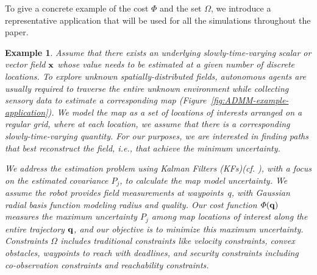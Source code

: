 \documentclass[journal]{IEEEtran}  %
\newtheorem{example}{Example}
\begin{document}
To give a concrete example of the cost $\varPhi$ and the set $\Omega$, we introduce a representative application that will be used for all the simulations throughout the paper.
\begin{example} Assume that there exists an underlying slowly-time-varying scalar or vector field $\mathbf{x}$ whose value needs to be estimated at a given number of discrete locations. To explore unknown spatially-distributed fields, autonomous agents are usually required to traverse the entire unknown environment while collecting sensory data to estimate a corresponding map (Figure~\ref{fig:ADMM-example-application}). We model the map as a set of locations of interests arranged on a regular grid, where at each location, we assume that there is a corresponding slowly-time-varying quantity. For our purposes, we are interested in finding paths that best reconstruct the field, i.e., that achieve the minimum uncertainty. 

We address the estimation problem using Kalman Filters (KFs)(cf. \cite{anderson2012optimal}), with a focus on the estimated covariance $P_j$, to calculate the map model uncertainty. We assume the robot provides field measurements at waypoints~$q$, with Gaussian radial basis function modeling radius and quality. Our cost function $\varPhi(\mathbf{q})$ measures the maximum uncertainty $P_{j}$ among map locations of interest along the entire trajectory $\mathbf{q}$, and our objective is to minimize this maximum uncertainty. Constraints $\Omega$ includes traditional constraints like velocity constraints, convex obstacles, waypoints to reach with deadlines, and security constraints including co-observation constraints and reachability constraints.
\end{example}
\end{document}
